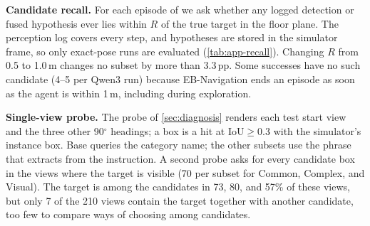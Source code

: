 \noindent\textbf{Candidate recall.}
For each episode of \ours we ask whether any logged detection or fused hypothesis ever lies within $R$ of the true
target in the floor plane. The perception log covers every step, and hypotheses are stored in the simulator frame,
so only exact-pose runs are evaluated (\cref{tab:app-recall}). Changing $R$ from 0.5 to 1.0\,m changes no subset by
more than 3.3\,pp. Some successes have no such candidate (4--5 per Qwen3 run) because EB-Navigation ends an
episode as soon as the agent is within 1\,m, including during exploration.

\begin{table}[t]
\centering\scriptsize
\caption{Candidate recall of \ours at $R=0.5$\,m (\% of episodes) and failed episodes split by whether such a
candidate ever existed.}
\label{tab:app-recall}
\end{table}

\noindent\textbf{Single-view probe.}
The probe of \cref{sec:diagnosis} renders each test start view and the three other 90$^\circ$ headings; a box is a
hit at IoU${\ge}0.3$ with the simulator's instance box. Base queries the category name; the other subsets use the
phrase that \ours extracts from the instruction. A second probe asks for every candidate box in the views where the
target is visible (70 per subset for Common, Complex, and Visual). The target is among the candidates in 73, 80, and
57\% of these views, but only 7 of the 210 views contain the target together with another candidate, too few to
compare ways of choosing among candidates.


